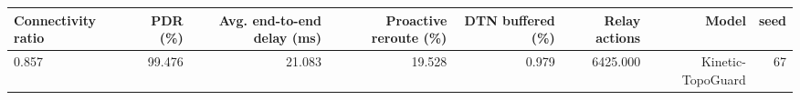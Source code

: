 \begin{tabular}{lrrrrrrr}
\toprule
Connectivity ratio & PDR (\%) & Avg. end-to-end delay (ms) & Proactive reroute (\%) & DTN buffered (\%) & Relay actions & Model & seed \\
\midrule
0.857 & 99.476 & 21.083 & 19.528 & 0.979 & 6425.000 & Kinetic-TopoGuard & 67 \\
\bottomrule
\end{tabular}